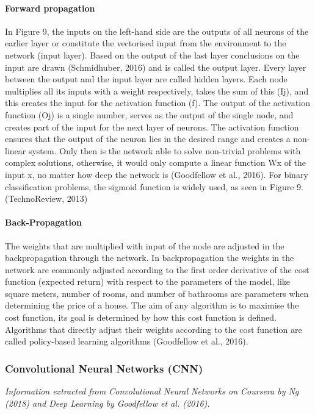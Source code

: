 \paragraph{Forward propagation}
In Figure 9, the inputs on the left-hand side are the outputs of all neurons of the earlier layer or constitute the vectorised input from the environment to the network (input layer). Based on the output of the last layer conclusions on the input are drawn (Schmidhuber, 2016) and is called the output layer. Every layer between the output and the input layer are called hidden layers. Each node multiplies all its inputs with a weight respectively, takes the sum of this (Ij), and this creates the input for the activation function (f). The output of the activation function (Oj) is a single number, serves as the output of the single node, and creates part of the input for the next layer of neurons. The activation function ensures that the output of the neuron lies in the desired range and creates a non-linear system. Only then is the network able to solve non-trivial problems with complex solutions, otherwise, it would only compute a linear function Wx of the input x, no matter how deep the network is (Goodfellow et al., 2016). For binary classification problems, the sigmoid function is widely used, as seen in Figure 9. (TechnoReview, 2013)

\paragraph{Back-Propagation}
The weights that are multiplied with input of the node are adjusted in the backpropagation through the network. In backpropagation the weights in the network are commonly adjusted according to the first order derivative of the cost function (expected return) with respect to the parameters of the model, like square meters, number of rooms, and number of bathrooms are parameters when determining the price of a house. The aim of any algorithm is to maximise the cost function, its goal is determined by how this cost function is defined. Algorithms that directly adjust their weights according to the cost function are called policy-based learning algorithms (Goodfellow et al., 2016).

\subsubsection*{Convolutional Neural Networks (CNN)}
\textit{Information extracted from Convolutional Neural Networks on Coursera by Ng (2018) and Deep Learning by Goodfellow et al. (2016).}


